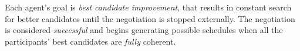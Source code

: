 \documentclass[ThesisDoc]{subfiles}
\begin{document}
%
%
%
%
Each agent's goal is \emph{best candidate improvement}, that results in constant
search for better candidates until the negotiation is stopped externally.
The negotiation is considered \emph{successful} and begins generating
possible schedules when all the participants' best candidates are \emph{fully} coherent.








\end{document}
